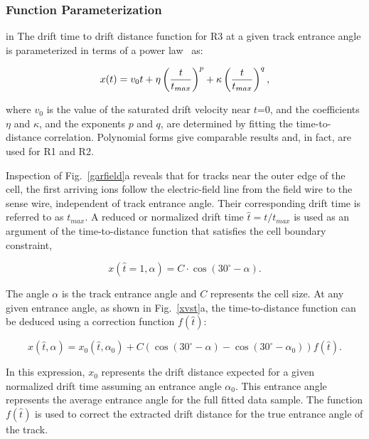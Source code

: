 \subsubsection{Function Parameterization}
\label{funcpar} 

 in
The drift time to drift distance function for R3 at a given track entrance 
angle is parameterized in terms of a power law~\cite{mdm95} as:

\begin{equation}
x(t) = v_0 t + \eta \left( {t \over t_{max}} \right)^p
+ \kappa \left( { t \over t_{max}} \right)^q,
\end{equation}

\noindent
where $v_0$ is the value of the saturated drift velocity near $t$=0, and the 
coefficients $\eta$ and $\kappa$, and the exponents $p$ and $q$, are 
determined by fitting the time-to-distance correlation.  Polynomial forms give
comparable results and, in fact, are used for R1 and R2.

Inspection of  Fig.~\ref{garfield}a reveals that for tracks near the outer
edge of the cell, the first arriving ions follow the electric-field line from 
the field wire to the sense wire, independent of track entrance angle.  Their 
corresponding drift time is referred to as $t_{max}$.  A reduced or normalized 
drift time $\hat{t}=t/t_{max}$ is used as an argument of the time-to-distance
function that satisfies the cell boundary constraint,

\begin{equation} 
\label{eq-xtmax}
x(\hat{t}=1,\alpha)=C \cdot \cos(30^\circ-\alpha).
\end{equation}

\noindent
The angle $\alpha$ is the track entrance angle and $C$ represents the cell 
size.  At any given entrance angle, as shown in Fig.~\ref{xvst}a, the 
time-to-distance function can be deduced using a correction function 
$f(\hat{t})$:

\begin{equation} 
\label{eq-xtang}
x(\hat{t},\alpha) = x_0(\hat{t},\alpha_0) +C \left (\cos \left(30^\circ-\alpha\right)
-\cos\left(30^\circ-\alpha_0\right)\right) f(\hat{t}).
\end{equation}

\noindent
In this expression, $x_0$ represents the drift distance expected for a given
normalized drift time assuming an entrance angle $\alpha_0$.  This entrance
angle represents the average entrance angle for the full fitted data sample.
The function $f(\hat{t})$ is used to correct the extracted drift distance for 
the true entrance angle of the track.

